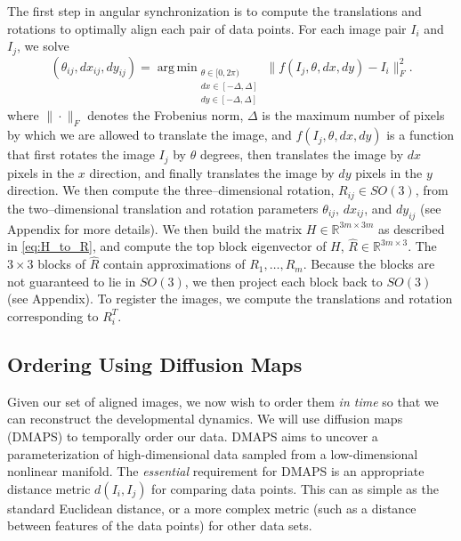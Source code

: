 \documentclass[11pt]{article}
\DeclareMathOperator*{\argmin}{arg\,min}
\begin{document}
The first step in angular synchronization is to compute the translations and rotations to optimally align each pair of data points. 
%
For each image pair $I_i$ and $I_j$, we solve
\begin{equation}\label{eq:opt_pairwise}
(\theta_{ij}, dx_{ij}, dy_{ij}) = \argmin_{
\begin{matrix}
\theta \in [0, 2\pi) \\ 
dx \in [-\Delta, \Delta]\\ 
dy \in [-\Delta, \Delta]
\end{matrix}
} \|f(I_j, \theta, dx, dy) - I_i \|_F^2.
\end{equation}
where $\| \cdot \|_F$ denotes the Frobenius norm, $\Delta$ is the maximum number of pixels by which we are allowed to translate the image, and $f(I_j, \theta, dx, dy)$ is a function that first rotates the image $I_j$ by $\theta$ degrees, then translates the image by $dx$ pixels in the $x$ direction, and finally translates the image by $dy$ pixels in the $y$ direction. 
%
We then compute the three--dimensional rotation, $R_{ij} \in SO(3)$, from the two--dimensional translation and rotation parameters $\theta_{ij}$, $dx_{ij}$, and $dy_{ij}$ (see Appendix for more details).
%
We then build the matrix $H \in \mathbb{R}^{3m \times 3m}$ as described in \eqref{eq:H_to_R}, and compute the top block eigenvector of $H$, $\hat{R} \in \mathbb{R}^{3m \times 3}.$ 
%
The $3 \times 3$ blocks of $\hat{R}$ contain approximations of $R_1, \dots, R_m$.  
%
Because the blocks are not guaranteed to lie in $SO(3)$, we then project each block back to $SO(3)$ (see Appendix).
%
To register the images, we compute the translations and rotation corresponding to $R_i^T$. 

\subsection{Ordering Using Diffusion Maps}

Given our set of aligned images, we now wish to order them {\em in time} so that we can reconstruct the developmental dynamics.
%
We will use diffusion maps (DMAPS) \cite{coifman2005geometric} to temporally order our data.
%
DMAPS aims to uncover a parameterization of high-dimensional data sampled from a low-dimensional nonlinear manifold.
%
The {\em essential} requirement for DMAPS is an appropriate distance metric $d(I_i, I_j)$ for comparing data points. 
%
This can as simple as the standard Euclidean distance, or a more complex metric (such as a distance between features of the data points) for other data sets.
\end{document}
